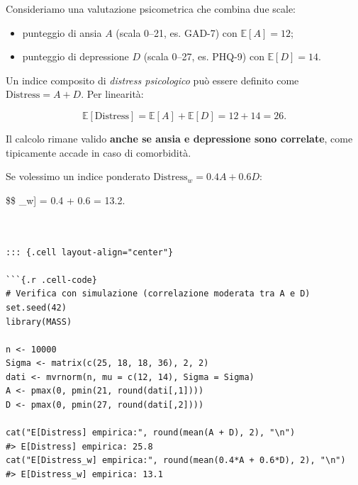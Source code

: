 \documentclass[
  italian,
  letterpaper,
  a4paper,
  11pt,
  open=any]{scrbook}
\providecommand{\tightlist}{%
  \setlength{\itemsep}{0pt}\setlength{\parskip}{0pt}}
\theoremstyle{plain}
\theoremstyle{definition}
\theoremstyle{definition}
\theoremstyle{remark}
\begin{document}
\begin{tcolorbox}[enhanced jigsaw, arc=.35mm, bottomrule=.15mm, bottomtitle=1mm, breakable, colback=white, colbacktitle=quarto-callout-note-color!10!white, colframe=quarto-callout-note-color-frame, coltitle=black, left=2mm, leftrule=.75mm, opacityback=0, opacitybacktitle=0.6, rightrule=.15mm, title=\textcolor{quarto-callout-note-color}{\faInfo}\hspace{0.5em}{Esempio: Punteggio composito di ansia e depressione}, titlerule=0mm, toprule=.15mm, toptitle=1mm]

Consideriamo una valutazione psicometrica che combina due scale:

\begin{itemize}
\tightlist
\item
  punteggio di ansia \(A\) (scala 0--21, es. GAD-7) con
  \(\mathbb{E}[A] = 12\);
\item
  punteggio di depressione \(D\) (scala 0--27, es. PHQ-9) con
  \(\mathbb{E}[D] = 14\).
\end{itemize}

Un indice composito di \emph{distress psicologico} può essere definito
come \(\text{Distress} = A + D\). Per linearità:

\[
\mathbb{E}[\text{Distress}] = \mathbb{E}[A] + \mathbb{E}[D] = 12 + 14 = 26.
\]

Il calcolo rimane valido \textbf{anche se ansia e depressione sono
correlate}, come tipicamente accade in caso di comorbidità.

Se volessimo un indice ponderato \(\text{Distress}_w = 0.4A + 0.6D\):

\$\$ \mathbb{E}{[}\_w{]} = 0.4  + 0.6  =
13.2.

\begin{verbatim}


::: {.cell layout-align="center"}

```{.r .cell-code}
# Verifica con simulazione (correlazione moderata tra A e D)
set.seed(42)
library(MASS)

n <- 10000
Sigma <- matrix(c(25, 18, 18, 36), 2, 2)
dati <- mvrnorm(n, mu = c(12, 14), Sigma = Sigma)
A <- pmax(0, pmin(21, round(dati[,1])))
D <- pmax(0, pmin(27, round(dati[,2])))

cat("E[Distress] empirica:", round(mean(A + D), 2), "\n")
#> E[Distress] empirica: 25.8
cat("E[Distress_w] empirica:", round(mean(0.4*A + 0.6*D), 2), "\n")
#> E[Distress_w] empirica: 13.1
\end{verbatim}

\end{tcolorbox}
\end{document}
